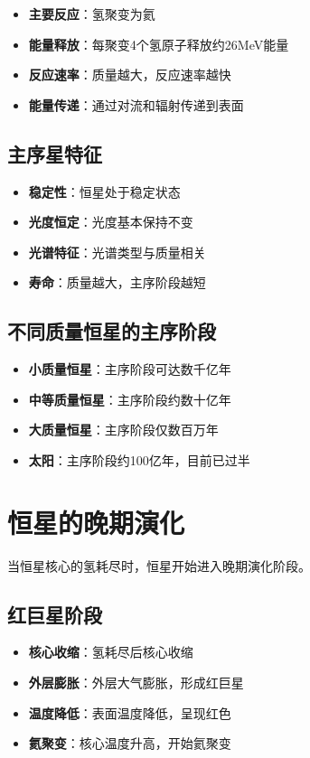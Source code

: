 \documentclass[12pt,UTF8]{ctexbook}
\begin{document}
\begin{itemize}
  \item \textbf{主要反应}：氢聚变为氦
  \item \textbf{能量释放}：每聚变4个氢原子释放约26MeV能量
  \item \textbf{反应速率}：质量越大，反应速率越快
  \item \textbf{能量传递}：通过对流和辐射传递到表面
\end{itemize}

\subsection{主序星特征}

\begin{itemize}
  \item \textbf{稳定性}：恒星处于稳定状态
  \item \textbf{光度恒定}：光度基本保持不变
  \item \textbf{光谱特征}：光谱类型与质量相关
  \item \textbf{寿命}：质量越大，主序阶段越短
\end{itemize}

\subsection{不同质量恒星的主序阶段}

\begin{itemize}
  \item \textbf{小质量恒星}：主序阶段可达数千亿年
  \item \textbf{中等质量恒星}：主序阶段约数十亿年
  \item \textbf{大质量恒星}：主序阶段仅数百万年
  \item \textbf{太阳}：主序阶段约100亿年，目前已过半
\end{itemize}

\section{恒星的晚期演化}

当恒星核心的氢耗尽时，恒星开始进入晚期演化阶段。

\subsection{红巨星阶段}

\begin{itemize}
  \item \textbf{核心收缩}：氢耗尽后核心收缩
  \item \textbf{外层膨胀}：外层大气膨胀，形成红巨星
  \item \textbf{温度降低}：表面温度降低，呈现红色
  \item \textbf{氦聚变}：核心温度升高，开始氦聚变
\end{itemize}
\end{document}

